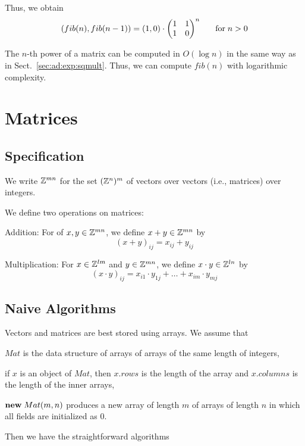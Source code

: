 Thus, we obtain
\[(fib(n),fib(n-1))= (1,0)\cdot\begin{pmatrix}1&1\\1&0\end{pmatrix}^n \hspace*{.5cm}\;\mathrm{for}\; n>0\]

The $n$-th power of a matrix can be computed in $O(\log n)$ in the same way as in Sect.~\ref{sec:ad:exp:sqmult}.
Thus, we can compute $fib(n)$ with logarithmic complexity.

\section{Matrices}

\subsection{Specification}

We write $\mathbb{Z}^{mn}$ for the set $(\mathbb{Z}^n)^m$ of vectors over vectors (i.e., matrices) over integers.

We define two operations on matrices:
\begin{compactitem}
\item Addition: For of $x,y\in \mathbb{Z}^{mn}$, we define $x+y\in\mathbb{Z}^{mn}$ by
\[(x+y)_{ij}=x_{ij}+y_{ij}\]

\item Multiplication: For $x\in \mathbb{Z}^{lm}$ and $y\in \mathbb{Z}^{mn}$, we define $x\cdot y\in\mathbb{Z}^{ln}$ by
\[(x\cdot y)_{ij}=x_{i1}\cdot y_{1j} +\ldots +x_{im}\cdot y_{mj}\]
\end{compactitem}


\subsection{Naive Algorithms}

Vectors and matrices are best stored using arrays.
We assume that
\begin{compactitem}
 \item $Mat$ is the data structure of arrays of arrays of the same length of integers,
 \item if $x$ is an object of $Mat$, then $x.rows$ is the length of the array and $x.columns$ is the length of the inner arrays,
 \item $\textbf{new}\; Mat(m,n)$ produces a new array of length $m$ of arrays of length $n$ in which all fields are initialized as $0$.
\end{compactitem}

Then we have the straightforward algorithms
\begin{acode}
 \\
\\
\end{acode}

